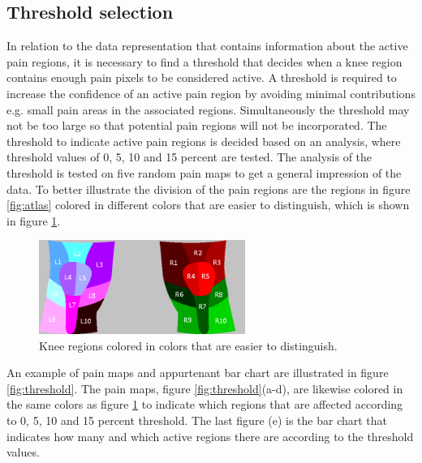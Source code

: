 \subsection{Threshold selection}\label{sec:Selectthreshold}
In relation to the data representation that contains information about the active pain regions, it is necessary to find a threshold that decides when a knee region contains enough pain pixels to be considered active. A threshold is required to increase the confidence of an active pain region by avoiding minimal contributions e.g. small pain areas in the associated regions. Simultaneously the threshold may not be too large so that potential pain regions will not be incorporated. The threshold to indicate active pain regions is decided based on an analysis, where threshold values of 0, 5, 10 and 15 percent are tested. The analysis of the threshold is tested on five random pain maps to get a general impression of the data. To better illustrate the division of the pain regions are the regions in figure \ref{fig:atlas} colored in different colors that are easier to distinguish, which is shown in figure \ref{fig:colorregion}.

\begin{figure} [H]
\centering
\includegraphics[width=0.6\textwidth]{figures/colorregion}
\caption{Knee regions colored in colors that are easier to distinguish.}
\label{fig:colorregion}
\end{figure}

\noindent
An example of pain maps and appurtenant bar chart are illustrated in figure \ref{fig:threshold}. The pain maps, figure \ref{fig:threshold}(a-d), are likewise colored in the same colors as figure \ref{fig:colorregion} to indicate which regions that are affected according to 0, 5, 10 and 15 percent threshold. The last figure (e) is the bar chart that indicates how many and which active regions there are according to the threshold values.

